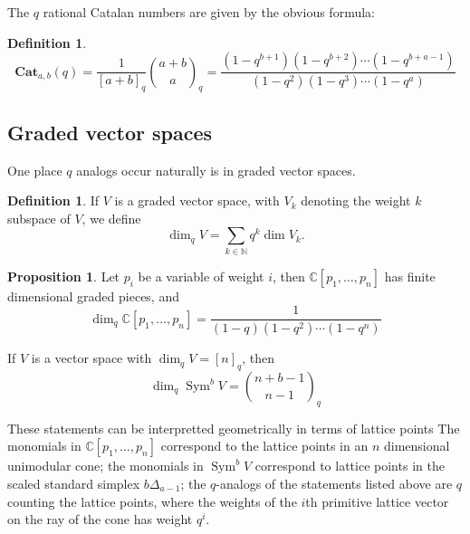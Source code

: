 \documentclass{amsart}[12pt]
\theoremstyle{definition}
\newtheorem{definition}[dummy]{Definition}
\newtheorem{proposition}[dummy]{Proposition}
\newcommand{\C}{\mathbb{C}}
\newcommand{\N}{\mathbb{N}}
\newcommand{\Cat}{\mathbf{Cat}}
\DeclareMathOperator{\Sym}{Sym}
\begin{document}
The $q$ rational Catalan numbers are given by the obvious formula:
\begin{definition}
$$\Cat_{a,b}(q)=\frac{1}{[a+b]_q} \binom{a+b}{a}_q=
\frac{(1-q^{b+1})(1-q^{b+2})\cdots (1-q^{b+a-1})}{(1-q^2)(1-q^3)\cdots (1-q^a)}$$
\end{definition}


\subsection{Graded vector spaces}

One place $q$ analogs occur naturally is in graded vector spaces.
\begin{definition}
If $V$ is a graded vector space, with $V_k$ denoting the weight $k$ subspace of $V$, we define $$\dim_qV=\sum_{k\in \N} q^k\dim V_k.$$
\end{definition}

\begin{proposition}
Let $p_i$ be a variable of weight $i$, then $\C[p_1,\dots, p_n]$ has
finite dimensional graded pieces, and
$$\dim_q \C[p_1,\dots, p_n]=\frac{1}{(1-q)(1-q^2)\cdots(1-q^n)}$$

If $V$ is a vector space with $\dim_qV=[n]_q$, then
$$\dim_q \Sym^b V=\binom{n+b-1}{n-1}_q$$
\end{proposition}

These statements can be interpretted geometrically in terms of lattice
points   The monomials in $\C[p_1,\dots, p_n]$ correspond to the lattice points in an $n$ dimensional unimodular cone; the monomials in $\Sym^b V$ correspond to lattice points in the scaled standard simplex $b\Delta_{a-1}$; the $q$-analogs of the statements listed above are $q$ counting the lattice points, where the weights of the $i$th primitive lattice vector on the ray of the cone has weight $q^i$.
\end{document}

